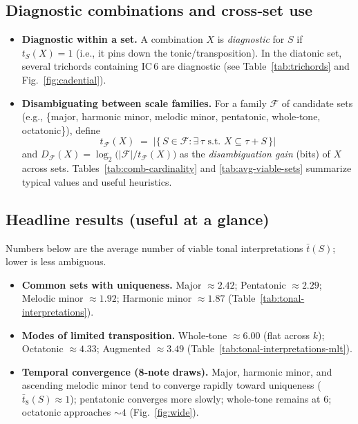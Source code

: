 \documentclass[10pt,twocolumn]{article}
\numberwithin{equation}{section} %
\begin{document}
    \subsection*{Diagnostic combinations and cross‑set use}
    \begin{itemize}
        \item \textbf{Diagnostic within a set.} A combination $X$ is \emph{diagnostic} for $S$ if $t_S(X)=1$ (i.e., it pins down the tonic/transposition). In the diatonic set, several trichords containing IC\,6 are diagnostic (see Table~\ref{tab:trichords} and Fig.~\ref{fig:cadential}).
        \item \textbf{Disambiguating between scale families.} For a family $\mathcal{F}$ of candidate sets (e.g., \{major, harmonic minor, melodic minor, pentatonic, whole‑tone, octatonic\}), define
        \[
            t_{\mathcal{F}}(X) \;=\; \bigl|\{\,S\in\mathcal{F}:\exists\,\tau \text{ s.t. } X\subseteq \tau{+}S\,\}\bigr|
        \]
        and $D_{\mathcal{F}}(X)=\log_2\!\bigl(|\mathcal{F}|/t_{\mathcal{F}}(X)\bigr)$ as the \emph{disambiguation gain} (bits) of $X$ across sets. Tables~\ref{tab:comb-cardinality} and \ref{tab:avg-viable-sets} summarize typical values and useful heuristics.
    \end{itemize}

    \subsection*{Headline results (useful at a glance)}
    Numbers below are the average number of viable tonal interpretations $\bar{t}(S)$; lower is less ambiguous.
    \begin{itemize}
        \item \textbf{Common sets with uniqueness.} Major $\approx 2.42$; Pentatonic $\approx 2.29$; Melodic minor $\approx 1.92$; Harmonic minor $\approx 1.87$ (Table~\ref{tab:tonal-interpretations}).
        \item \textbf{Modes of limited transposition.} Whole‑tone $\approx 6.00$ (flat across $k$); Octatonic $\approx 4.33$; Augmented $\approx 3.49$ (Table~\ref{tab:tonal-interpretations-mlt}).
        \item \textbf{Temporal convergence (8‑note draws).} Major, harmonic minor, and ascending melodic minor tend to converge rapidly toward uniqueness ($\bar{t}_8(S)\approx 1$); pentatonic converges more slowly; whole‑tone remains at $6$; octatonic approaches ${\sim}4$ (Fig.~\ref{fig:wide}).
    \end{itemize}
\end{document}
